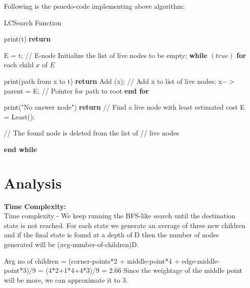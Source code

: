 \documentclass[conference]{IEEEtran}
\begin{document}
Following is the psuedo-code implementing above algorithm:\\
\begin{algorithm}
\caption{LCSearch Function}
    \label{fup}
    \begin{algorithmic}[1]
            \State print(t)
            \State \textbf{return} 
        \EndIf
        
        \State E = t; // E-node
        \State Initialize the list of live nodes to be empty;
        \State
        \State \textbf{while} $(true)$ 
        \State \textbf{for} each child $x$ of $E$ 
                
                    \State print(path from x to t)
                    \State \textbf{return}
                \EndIf
                \State Add (x); // Add x to list of live nodes;
                \State x$->$parent = E; // Pointer for path to root
        \State \textbf{end for}
        
        \State
            \State print("No answer node")
            \State \textbf{return}
        \EndIf
        \State
        \State// Find a live node with least estimated cost
        \State E = Least(); 

        \State // The found node is deleted from the list of 
        \State // live nodes
        
        \State \textbf{end while}
        
        
    \EndFunction
  \end{algorithmic}
\end{algorithm}

\section{Analysis}


\textbf{Time Complexity:} \\
Time complexity - 
 We keep running the BFS-like search until the destination state is not reached. For each state we generate an average of three new children and if the final state is found at a depth of D then the number of nodes generated will be (avg-number-of-children)D.

Avg no of children = (corner-points*2 + middle-point*4 + edge-middle-point*3)/9
		=   (4*2+1*4+4*3)/9  =  2.66 
Since the weightage of the middle point will be more, we can approximate it to 3. 
\end{document}
